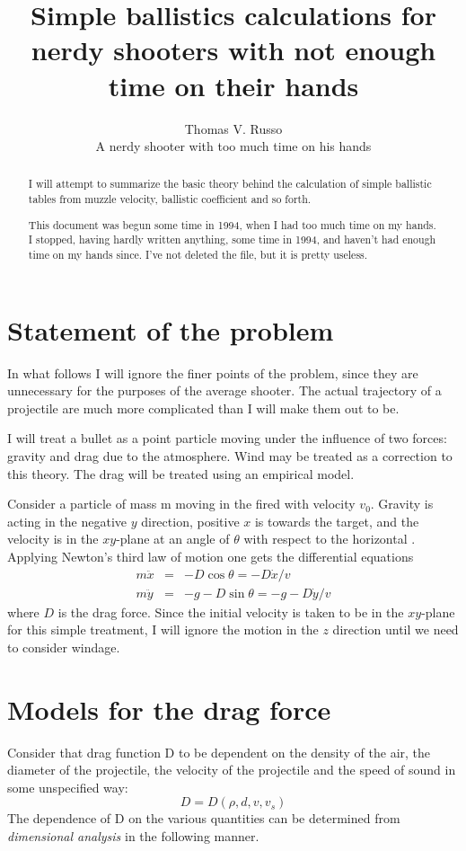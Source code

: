 \documentclass[12pt]{article}
\begin{document}
\author{Thomas V. Russo\\A nerdy shooter with too much time on his hands}
\title{Simple ballistics calculations for nerdy shooters with not
enough time on their hands}
\maketitle
\begin{abstract}
I will attempt to summarize the basic theory behind the calculation of
simple ballistic tables from muzzle velocity, ballistic coefficient
and so forth.

This document was begun some time in 1994, when I had too much time on
my hands.  I stopped, having hardly written anything, some time in
1994, and haven't had enough time on my hands since.  I've not deleted
the file, but it is pretty useless.
\end{abstract}
\section{Statement of the problem}
In what follows I will ignore the finer points of the problem, since
they are unnecessary for the purposes of the average shooter.  The
actual trajectory of a projectile are much more complicated than I
will make them out to be.  

I will treat a bullet as a point particle moving under the influence
of two forces: gravity and drag due to the atmosphere. Wind may be
treated as a correction to this theory.  The drag will be treated
using an empirical model.

Consider a particle of mass m moving in the fired with velocity $v_0$.
Gravity is acting in the negative $y$ direction, positive $x$ is
towards the target, and the velocity is in the $xy$-plane at an angle
of $\theta$ with respect to the horizontal .  Applying Newton's third
law of motion one gets the differential equations
\begin{eqnarray}
\label{eq:newton-3}
m\ddot{x} &=& -D\cos\theta =-D \dot{x}/v\\
m\ddot{y} &=& -g - D\sin\theta = -g - D \dot{y}/v 
\end{eqnarray}
where $D$ is the drag force.  Since the initial velocity is taken
to be in the $xy$-plane for this simple treatment, I will ignore the
motion in the $z$ direction until we need to consider windage.

\section{Models for the drag force}
Consider that drag function D to be dependent on the density of the
air, the diameter of the projectile, the velocity of the projectile
and the speed of sound in some unspecified way:
\begin{equation} D=D(\rho,d,v,v_s) \end{equation}
The dependence of D on the various quantities can be determined from
{\em dimensional analysis} in the following manner.
\end{document}
